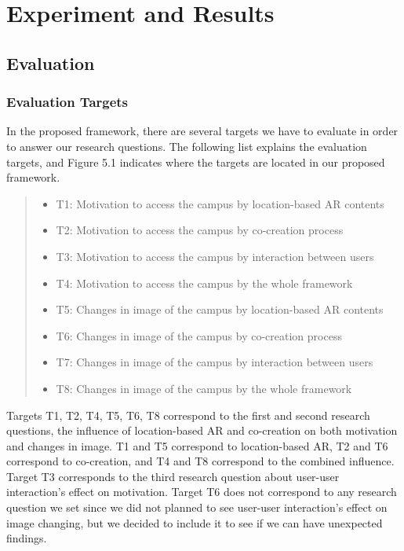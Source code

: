 \chapter{Experiment and Results}\label{ch:5}

\section{Evaluation}

\subsection{Evaluation Targets}

In the proposed framework, there are several targets we have to evaluate in order to answer our research questions.
The following list explains the evaluation targets, and Figure 5.1 indicates where the targets are located in our proposed framework.

\begin{quote}
  \begin{itemize}
    \item T1: Motivation to access the campus by location-based AR contents
    \item T2: Motivation to access the campus by co-creation process
    \item T3: Motivation to access the campus by interaction between users
    \item T4: Motivation to access the campus by the whole framework
    \item T5: Changes in image of the campus by location-based AR contents
    \item T6: Changes in image of the campus by co-creation process
    \item T7: Changes in image of the campus by interaction between users
    \item T8: Changes in image of the campus by the whole framework
  \end{itemize}
\end{quote}

Targets T1, T2, T4, T5, T6, T8 correspond to the first and second research questions,
the influence of location-based AR and co-creation on both motivation and changes in image.
T1 and T5 correspond to location-based AR, T2 and T6 correspond to co-creation, and T4 and T8 correspond to the combined influence.
Target T3 corresponds to the third research question about user-user interaction's effect on motivation.
Target T6 does not correspond to any research question we set since we did not planned to see user-user interaction's effect on image changing,
but we decided to include it to see if we can have unexpected findings.

